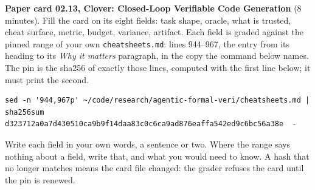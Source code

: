 \documentclass[11pt]{article}
\begin{document}
\begin{problem}\label{prob:B4}
\textbf{Paper card 02.13, Clover: Closed-Loop Verifiable Code Generation}
(8 minutes). Fill the card on its eight fields: task shape, oracle, what is
trusted, cheat surface, metric, budget, variance, artifact. Each field is
graded against the pinned range of your own \texttt{cheatsheets.md}: lines
944--967, the entry from its heading to its \emph{Why it matters} paragraph,
in the copy the command below names. The pin is the sha256 of exactly those
lines, computed with the first line below; it must print the second.
{\small
\begin{verbatim}
sed -n '944,967p' ~/code/research/agentic-formal-veri/cheatsheets.md | sha256sum
d323712a0a7d430510ca9b9f14daa83c0c6ca9ad876eaffa542ed9c6bc56a38e  -
\end{verbatim}
}
Write each field in your own words, a sentence or two. Where the range says
nothing about a field, write that, and what you would need to know. A hash
that no longer matches means the card file changed: the grader refuses the
card until the pin is renewed.
\end{problem}
\end{document}
